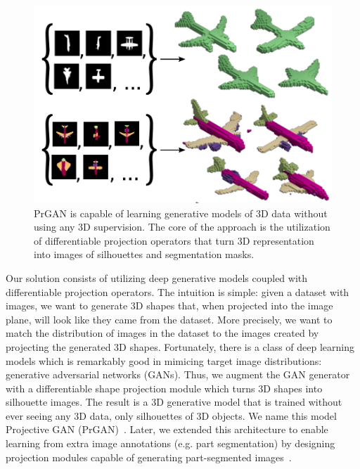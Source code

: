 \begin{figure}
\vspace{-20pt}
 \begin{center}
 \includegraphics[width=\linewidth]{figs/prganpp.png}
 \end{center}
 \vspace{-20pt}
 \caption{\small PrGAN is capable of learning generative models of 3D data without using any 3D supervision.
 The core of the approach is the utilization of differentiable projection operators
 that turn 3D representation into images of silhouettes and segmentation masks.}
 \vspace{-5pt}
\end{figure}
Our solution consists of utilizing deep generative models coupled with differentiable projection operators.
The intuition is simple: given a dataset with images, we want to generate 3D shapes that, when projected into the image plane, will look like they came from the dataset.
More precisely, we want to match the distribution of images in the dataset to the images created by projecting the generated 3D shapes.
Fortunately, there is a class of deep learning models which is remarkably good in mimicing target image
distributions: generative adversarial networks (GANs).
Thus, we augment the GAN generator with a differentiable shape projection module which turns 3D shapes into silhouette images.
The result is a 3D generative model that is trained without ever seeing any 3D data, only silhouettes of 3D objects.
We name this model Projective GAN (PrGAN)~\cite{prgan}.
Later, we extended this architecture to enable learning from extra image annotations (e.g. part segmentation) by designing projection modules capable of generating part-segmented images~\cite{prganpp}.


